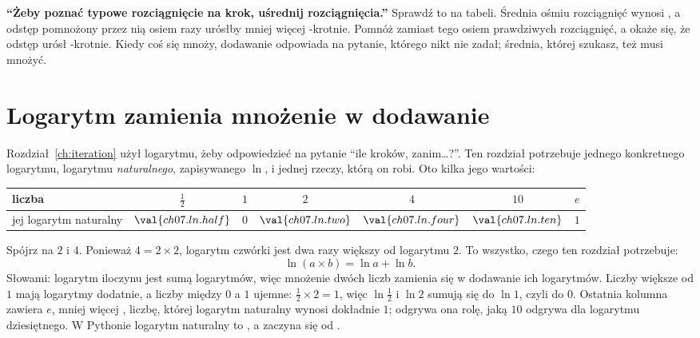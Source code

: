 \begin{trapbox}
\textbf{\enquote{Żeby poznać typowe rozciągnięcie na krok, uśrednij
rozciągnięcia.}} Sprawdź to na tabeli. Średnia ośmiu rozciągnięć wynosi
, a odstęp pomnożony przez nią osiem razy urósłby mniej
więcej -krotnie. Pomnóż zamiast tego osiem prawdziwych
rozciągnięć, a okaże się, że odstęp urósł -krotnie.
Kiedy coś się mnoży, dodawanie odpowiada na pytanie, którego nikt nie zadał;
średnia, której szukasz, też musi mnożyć.
\end{trapbox}

\section{Logarytm zamienia mnożenie w dodawanie}
\label{sec:ch07-log}

\noindent
Rozdział~\ref{ch:iteration} użył logarytmu, żeby odpowiedzieć na pytanie
\enquote{ile kroków, zanim\ldots?}. Ten rozdział potrzebuje jednego
konkretnego logarytmu, logarytmu \emph{naturalnego}, zapisywanego $\ln$, i
jednej rzeczy, którą on robi. Oto kilka jego wartości:

\begin{center}
\begin{tabular}{lcccccc}
\toprule
liczba & $\tfrac12$ & $1$ & $2$ & $4$ & $10$ & $e$ \\
\midrule
jej logarytm naturalny & $\val{ch07.ln.half}$ & $0$ & $\val{ch07.ln.two}$ &
  $\val{ch07.ln.four}$ & $\val{ch07.ln.ten}$ & $1$ \\
\bottomrule
\end{tabular}
\end{center}

\noindent
Spójrz na $2$ i $4$. Ponieważ $4 = 2 \times 2$, logarytm czwórki jest dwa
razy większy od logarytmu $2$. To wszystko, czego ten rozdział potrzebuje:
\[ \ln(a \times b) = \ln a + \ln b. \]
Słowami: logarytm iloczynu jest sumą logarytmów, więc mnożenie dwóch liczb
zamienia się w dodawanie ich logarytmów. Liczby większe od $1$ mają logarytmy
dodatnie, a liczby między $0$ a $1$ ujemne: $\tfrac12 \times 2 = 1$, więc
$\ln\tfrac12$ i $\ln 2$ sumują się do $\ln 1$, czyli do $0$. Ostatnia
kolumna zawiera $e$, mniej więcej , liczbę, której logarytm
naturalny wynosi dokładnie $1$; odgrywa ona rolę, jaką $10$ odgrywa dla
logarytmu dziesiętnego. W Pythonie logarytm naturalny to , a
 zaczyna się od .

